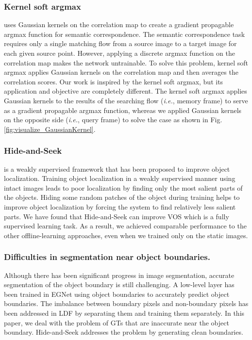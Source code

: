 \subsubsection{Kernel soft argmax}\cite{lee2019sfnet} uses Gaussian kernels on the correlation map to create a gradient propagable argmax function for semantic correspondence. The semantic correspondence task requires only a single matching flow from a source image to a target image for each given source point. However, applying a discrete argmax function on the correlation map makes the network untrainable. To solve this problem, kernel soft argmax applies Gaussian kernels on the correlation map and then averages the correlation scores. Our work is inspired by the kernel soft argmax, but its application and objective are completely different. The kernel soft argmax applies Gaussian kernels to the results of the searching flow (\textit{i.e.}, memory frame) to serve as a gradient propagable argmax function, whereas we applied Gaussian kernels on the opposite side (\textit{i.e.}, query frame) to solve the case as shown in Fig. \ref{fig:visualize_GaussianKernel}.

\subsubsection{Hide-and-Seek}\cite{singh2017hide} is a weakly supervised framework that has been proposed to improve object localization. Training object localization in a weakly supervised manner using intact images leads to poor localization by finding only the most salient parts of the objects. Hiding some random patches of the object during training helps to improve object localization by forcing the system to find relatively less salient parts. We have found that Hide-and-Seek can improve VOS which is a fully supervised learning task. As a result, we achieved comparable performance to the other offline-learning approaches, even when we trained only on the static images.

\subsubsection{Difficulties in segmentation near object boundaries.} 
Although there has been significant progress in image segmentation, accurate segmentation of the object boundary is still challenging. A low-level layer has been trained in EGNet \cite{zhao2019egnet} using object boundaries to accurately predict object boundaries. The imbalance between boundary pixels and non-boundary pixels has been addressed in LDF \cite{wei2020label} by separating them and training them separately. In this paper, we deal with the problem of GTs that are inaccurate near the object boundary. Hide-and-Seek addresses the problem by generating clean boundaries.

